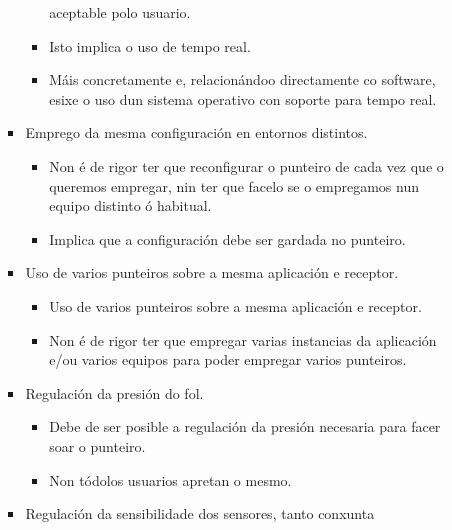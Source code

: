 \begin{itemize}
\begin{itemize}
\begin{itemize}
\begin{itemize}
                              aceptable polo usuario.
                        \item Isto implica o uso de tempo real.
                        \item Máis concretamente e, relacionándoo directamente
                              co software, esixe o uso dun sistema operativo
                              con soporte para tempo real.
                       \end{itemize}
                 \item Emprego da mesma configuración en entornos distintos.
                       \begin{itemize}
                        \item Non é de rigor ter que reconfigurar o punteiro de
                              cada vez que o queremos empregar, nin ter que
                              facelo se o empregamos nun equipo distinto ó
                              habitual.
                        \item Implica que a configuración debe ser gardada no
                              punteiro.
                       \end{itemize}
                 \item Uso de varios punteiros sobre a mesma aplicación e
                       receptor.
                       \begin{itemize}
                        \item Uso de varios punteiros sobre a mesma aplicación
                              e receptor.
                        \item Non é de rigor ter que empregar varias instancias
                              da aplicación e/ou varios equipos para poder
                              empregar varios punteiros.
                       \end{itemize}
                 \item Regulación da presión do fol.
                       \begin{itemize}
                        \item Debe de ser posible a regulación da presión
                              necesaria para facer soar o punteiro.
                        \item Non tódolos usuarios apretan o mesmo.
                       \end{itemize}
                 \item Regulación da sensibilidade dos sensores, tanto conxunta

\end{itemize}
\end{itemize}
\end{itemize}
